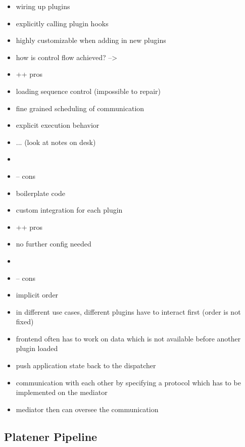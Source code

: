 \documentclass[../ClassicThesis.tex]{subfiles}
\begin{document}
\begin{itemize}
\item wiring up plugins
\item explicitly calling plugin hooks
\item highly customizable when adding in new plugins
\item how is control flow achieved? -->
\end{itemize}

\begin{itemize}
\item ++ pros
\item loading sequence control (impossible to repair)
\item fine grained scheduling of communication
\item explicit execution behavior
\item ... (look at notes on desk)
\item
\item -- cons
\item boilerplate code
\item custom integration for each plugin
\end{itemize}

\begin{itemize}
\item ++ pros
\item no further config needed
\item
\item -- cons
\item implicit order
\item in different use cases, different plugins have to interact first (order is not fixed)
\item frontend often has to work on data which is not available before another plugin loaded
\end{itemize}


\begin{itemize}
\item push application state back to the dispatcher
\item communication with each other by specifying a protocol which has to be implemented on the mediator
\item mediator then can oversee the communication
\end{itemize}


\subsection{Platener Pipeline}
\end{document}
